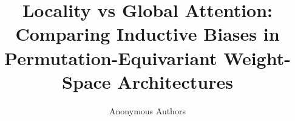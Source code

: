 \title{Locality vs Global Attention: Comparing Inductive Biases in Permutation-Equivariant Weight-Space Architectures}

\author{Anonymous Authors}

\maketitle
